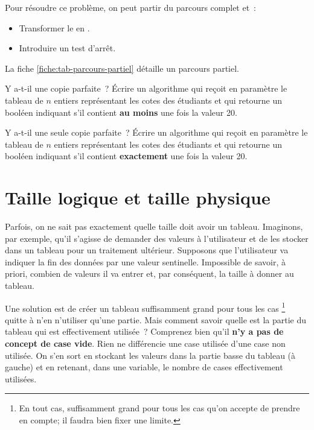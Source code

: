 			Pour résoudre ce problème,
			on peut partir du parcours complet et~:
			\begin{itemize}
			\item
				Transformer le  en .
			\item
				Introduire un test d’arrêt.
			\end{itemize}
			La fiche \vref{fiche:tab-parcours-partiel}
			détaille un parcours partiel.
				
			\begin{Exercice}{Y a-t-il une copie parfaite~?}
				Écrire un algorithme qui reçoit en paramètre le tableau
				 de $n$ entiers représentant les cotes des étudiants 
				et qui retourne un booléen 
				indiquant s’il contient \textbf{au moins} une fois la valeur 20. 
			\end{Exercice}

			\begin{Exercice}{Y a-t-il une seule copie parfaite~?}
				Écrire un algorithme qui reçoit en paramètre le tableau
				 de $n$ entiers représentant les cotes des étudiants 
				et qui retourne un booléen 
				indiquant s’il contient \textbf{exactement} une fois la valeur 20. 
			\end{Exercice}
		
	\section{Taille logique et taille physique} 

		Parfois, on ne sait pas exactement 
		quelle taille doit avoir un tableau.
		Imaginons, par exemple,
		qu’il s’agisse de demander des valeurs à l’utilisateur
		et de les stocker dans un tableau pour un traitement ultérieur.
		Supposons que l’utilisateur va indiquer la fin des données
		par une valeur sentinelle.
		Impossible de savoir, à priori, combien de valeurs il va entrer
		et, par conséquent, la taille à donner au tableau.
		
		Une solution est de créer un tableau suffisamment grand
		pour tous les cas%
		\footnote{%
			En tout cas, 
			suffisamment grand pour tous les cas qu’on accepte
			de prendre en compte; il faudra bien fixer une limite.
		} 
		quitte à n’en n’utiliser qu’une partie.
		Mais comment savoir quelle est la partie du tableau
		qui est effectivement utilisée~?
		Comprenez bien qu’il \textbf{n’y a pas de concept de case vide}.
		Rien ne différencie une case utilisée d’une case non utilisée.
		On s’en sort en stockant les valeurs 
		dans la partie basse du tableau (à gauche)
		et en retenant, dans une variable,
		le nombre de cases effectivement utilisées.
			

